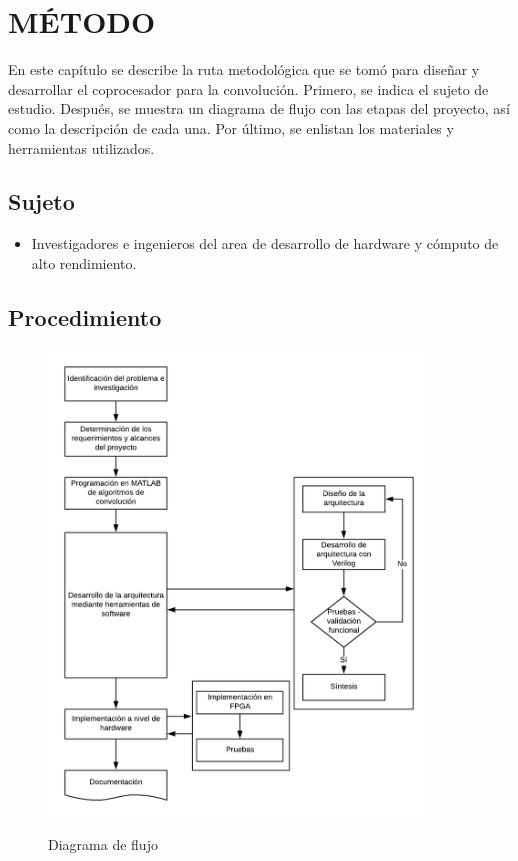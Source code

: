 \renewcommand\thechapter{\Roman{chapter}}
\chapter{MÉTODO} \label{ch:metodo} \thispagestyle{fancy}
\renewcommand\thechapter{\arabic{chapter}}
En este capítulo se describe la ruta metodológica que se tomó para diseñar y desarrollar el coprocesador para la convolución. Primero, se indica el sujeto de estudio. Después, se muestra un diagrama de flujo con las etapas del proyecto, así como la descripción de cada una. Por último, se enlistan los materiales y herramientas utilizados.


\section{Sujeto}
\begin{itemize}
\item Investigadores e ingenieros del area de desarrollo de hardware y cómputo de alto rendimiento. 
\end{itemize}

\section{Procedimiento}

\begin{figure}[!h]
\centering
\includegraphics[width=0.9\textwidth, height=0.9\textheight]{./figs/procedimiento}\\
\caption{Diagrama de flujo}
\label{diagramaflujo}
\end{figure}

